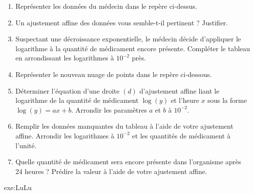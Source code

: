 {	\begin{enumerate}
		\item
		Représenter les données du médecin dans le repère ci-dessus.
		\item
		Un ajustement affine des données vous semble-t-il pertinent ? Justifier.
		\item
		Suspectant une décroissance exponentielle, le médecin décide d'appliquer le logarithme à la quantité de médicament encore présente.
		Compléter le tableau en arrondissant les logarithmes à $10^{-2}$ près.
		\item
		Représenter le nouveau nuage de points dans le repère ci-dessous.
		\item 
		Déterminer l'équation d'une droite $(d)$ d'ajustement affine liant le logarithme de la quantité de médicament $\log(y)$ et l'heure $x$ sous la forme $\log(y)=ax+b$.
		Arrondir les paramètres $a$ et $b$ à $10^{-2}$.
		\item
		Remplir les données manquantes du tableau à l'aide de votre ajustement affine.
		Arrondir les logarithmes à $10^{-2}$ et les quantités de médicament à l'unité.
		\item
		Quelle quantité de médicament sera encore présente dans l'organisme après 24 heures ?
		Prédire la valeur à l'aide de votre ajustement affine.
	\end{enumerate}
	
	
	\begin{center}
	\end{center}
	
	
}{exe:LuLu}{
}




\label{lastpage}
\newpage
{}
\shipoutAnswer


